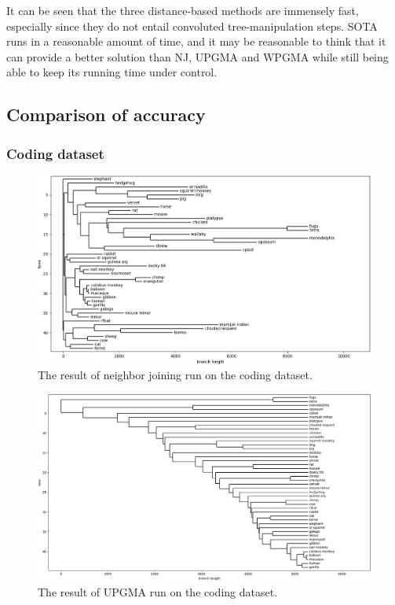\documentclass[11pt,twocolumn]{article}
\begin{document}

It can be seen that the three distance-based methods are immensely fast, especially since they do not entail convoluted tree-manipulation steps. SOTA runs in a reasonable amount of time, and it may be reasonable to think that it can provide a better solution than NJ, UPGMA and WPGMA while still being able to keep its running time under control.

\subsection{Comparison of accuracy}

\subsubsection{Coding dataset}

\begin{figure}
    \centering
    \includegraphics[width=\linewidth]{img/nj.png}
    \caption{The result of neighbor joining run on the coding dataset.}
    \label{fig:nj}
\end{figure}

\begin{figure}
    \centering
    \includegraphics[width=\linewidth]{img/upgma.png}
    \caption{The result of UPGMA run on the coding dataset.}
    \label{fig:upgma}
\end{figure}
\end{document}
